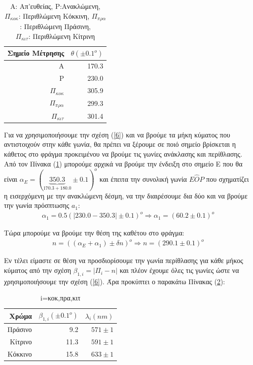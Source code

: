 \documentclass[a4paper]{article}
\begin{document}
	\begin{table}[h!]
		\centering
		\begin{tabular}{r|r}
			Σημείο Μέτρησης & $\theta(\pm0.1^o)$ \\\hline\hline
			A         & 170.3 \\ 
			P         & 230.0 \\ 
			$Π_{κοκ}$ & 305.9 \\ 
			$Π_{πρα}$ & 299.3 \\
			$Π_{κιτ}$ & 301.4 \\
		\end{tabular}
		\caption{Α: Απ'ευθείας, P:Ανακλώμενη,\\ $Π_{κοκ}$: Περιθλώμενη Κόκκινη, $Π_{πρα}$: Περιθλώμενη Πράσινη,\\ 	 $Π_{κιτ}$: Περιθλώμενη Κίτρινη }
		\label{mat1}
	\end{table}
	
	Για να χρησιμοποιήσουμε την σχέση (\ref{6}) και να βρούμε τα μήκη κύματος που αντιστοιχούν στην κάθε γωνία, θα πρέπει να ξέρουμε σε ποιό σημείο βρίσκεται η κάθετος στο φράγμα προκειμένου να βρούμε τις γωνίες ανάκλασης και περίθλασης. Από τον Πίνακα (\ref{mat1}) μπορούμε αρχικά να βρούμε την ένδειξη στο σημείο Ε που θα είναι $\alpha_E=(\underbrace{350.3}_{170.3+180.0}\pm0.1)^o$ και έπειτα την συνολική γωνία $E\hat{O}P$ που σχηματίζει η εισερχόμενη με την ανακλώμενη δέσμη, να την διαιρέσουμε δια δύο και να βρούμε την γωνία πρόσπτωσης $a_1$: 
	\begin{align*}
		\alpha_1 = 0.5( |230.0-350.3| \pm 0.1)^o \Rightarrow \boxed{\alpha_1 = (60.2\pm 0.1)^o}
	\end{align*}
	
Τώρα μπορούμε να βρούμε την θέση της καθέτου στο φράγμα:
	\begin{align*}
		n = ((\alpha_E+\alpha_1) \pm\delta n)^o \Rightarrow \boxed{n = (290.1\pm0.1)^o}
	\end{align*}

Εν τέλει είμαστε σε θέση να προσδιορίσουμε την γωνία περίθλασης για κάθε μήκος κύματος από την σχέση $\beta_{1,i}=|\Pi_{i} - n|$ και πλέον έχουμε όλες τις γωνίες ώστε να χρησιμοποιήσουμε την σχέση (\ref{6}). Άρα προκύπτει ο παρακάτω Πίνακας (\ref{mat2}): 
	\begin{table}[h!]
		\centering
		\begin{tabular}{r|r|r}
			Χρώμα & $\beta_{1,i}(\pm0.1^o)$ & $\lambda_{i}(nm)$\footnotemark \\\hline\hline 
			Πράσινο & 9.2  & $571\pm1$ \\ 
			Κίτρινο & 11.3 & $591\pm1$ \\ 
			Κόκκινο & 15.8 & $633\pm1$
		\end{tabular}
		\caption{i=κοκ,πρα,κιτ}
		\label{mat2}
	\end{table}
	
\end{document}

